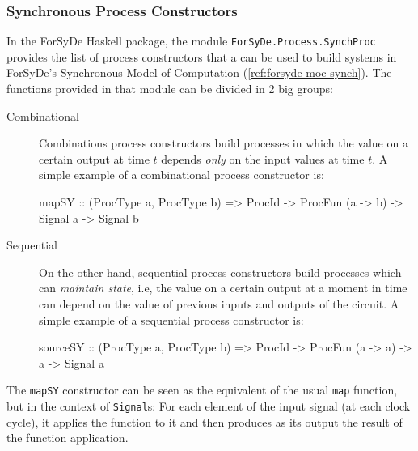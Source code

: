         \subsubsection{Synchronous Process Constructors}
        \label{subsubsec:forsyde-synchprocs}
            In the ForSyDe Haskell package, the module \texttt{ForSyDe.Process.SynchProc} provides
            the list of process constructors that a can be used to build systems in ForSyDe's
            Synchronous Model of Computation (\ref{ref:forsyde-moc-synch}). The functions provided
            in that module can be divided in 2 big groups:

            \begin{description}

                \item[Combinational] Combinations process constructors build processes in which the
                    value on a certain output at time $t$ depends \emph{only} on the input values at
                    time $t$. A simple example of a combinational process constructor is:

                    \begin{haskellcode}
    mapSY :: (ProcType a, ProcType b) => ProcId
          -> ProcFun (a -> b) -> Signal a -> Signal b
                    \end{haskellcode}

                \item[Sequential] On the other hand, sequential process constructors build processes
                    which can \emph{maintain state}, i.e, the value on a certain output at a moment
                    in time can depend on the value of previous inputs and outputs of the circuit. A
                    simple example of a sequential process constructor is:

                    \begin{haskellcode}
    sourceSY :: (ProcType a, ProcType b) => ProcId
             -> ProcFun (a -> a) -> a -> Signal a
                    \end{haskellcode}

            \end{description}

            The \texttt{mapSY} constructor can be seen as the equivalent of the usual \texttt{map}
            function, but in the context of \texttt{Signal}s: For each element of the input signal
            (at each clock cycle), it applies the function to it and then produces as its output the
            result of the function application.

